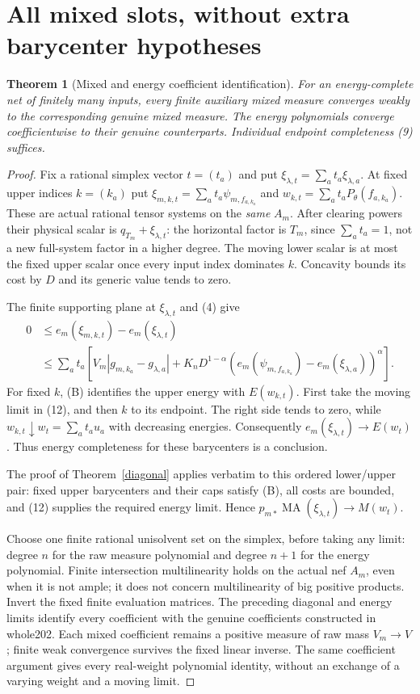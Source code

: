 \documentclass[11pt]{article}
\newtheorem{theorem}{Theorem}
\newcommand{\MA}{\operatorname{MA}}
\begin{document}
\section{All mixed slots, without extra barycenter hypotheses}
\begin{theorem}[Mixed and energy coefficient identification]\label{mixed}
For an energy-complete net of finitely many inputs, every finite
auxiliary mixed measure converges weakly to the corresponding
genuine mixed measure. The energy polynomials converge
coefficientwise to their genuine counterparts.
Individual endpoint completeness (9) suffices.
\end{theorem}
\begin{proof}
Fix a rational simplex vector $t=(t_a)$ and put
$\xi_{\lambda,t}=\sum_a t_a\xi_{\lambda,a}$.
At fixed upper indices $k=(k_a)$ put
$\xi_{m,k,t}=\sum_a t_a\psi_{m,f_{a,k_a}}$ and
$w_{k,t}=\sum_a t_aP_\theta(f_{a,k_a})$.
These are actual rational tensor systems on the \emph{same} $A_m$.
After clearing powers their physical scalar is
$q_{T_m}+\xi_{\lambda,t}$: the horizontal factor is $T_m$,
since $\sum_a t_a=1$, not a new full-system factor in a higher degree.
The moving lower scalar is at most the fixed upper scalar
once every input index dominates $k$.
Concavity bounds its cost by $D$ and its generic value tends to zero.

The finite supporting plane at $\xi_{\lambda,t}$ and (4) give
\[
\begin{split}
0&\leq e_m(\xi_{m,k,t})-e_m(\xi_{\lambda,t})\\
&\leq\sum_a t_a\left[
 V_m|g_{m,k_a}-g_{\lambda,a}|
 +K_nD^{1-\alpha}
  (e_m(\psi_{m,f_{a,k_a}})-e_m(\xi_{\lambda,a}))^\alpha
 \right].
\end{split}                                             \tag{12}
\]
For fixed $k$, (B) identifies the upper energy with $E(w_{k,t})$.
First take the moving limit in (12), and then $k$ to its endpoint.
The right side tends to zero, while
$w_{k,t}\downarrow w_t=\sum_a t_a u_a$ with decreasing energies.
Consequently $e_m(\xi_{\lambda,t})\to E(w_t)$.
Thus energy completeness for these barycenters is a conclusion.

The proof of Theorem~\ref{diagonal} applies verbatim to this
ordered lower/upper pair: fixed upper barycenters and their caps
satisfy (B), all costs are bounded, and (12) supplies the required
energy limit. Hence
$p_{m*}\MA(\xi_{\lambda,t})\to M(w_t)$.

Choose one finite rational unisolvent set on the simplex,
before taking any limit: degree $n$ for the raw measure polynomial
and degree $n+1$ for the energy polynomial.
Finite intersection multilinearity holds on the actual nef $A_m$,
even when it is not ample; it does not concern multilinearity of
big positive products.
Invert the fixed finite evaluation matrices.
The preceding diagonal and energy limits identify every coefficient
with the genuine coefficients constructed in whole202.
Each mixed coefficient remains a positive measure of raw mass
$V_m\to V$; finite weak convergence survives the fixed linear inverse.
The same coefficient argument gives every real-weight polynomial
identity, without an exchange of a varying weight and a moving limit.
\end{proof}
\end{document}
